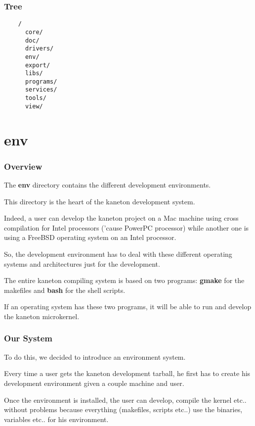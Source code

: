 
\begin{frame}[containsverbatim]
  \frametitle{Tree}

  \begin{center}

  \begin{verbatim}
    /
      core/
      doc/
      drivers/
      env/
      export/
      libs/
      programs/
      services/
      tools/
      view/
  \end{verbatim}

  \end{center}
\end{frame}

%
%

\section{env}


\begin{frame}
  \frametitle{Overview}

  The \textbf{env} directory contains the different development environments.

  \nl

  This directory is the heart of the kaneton development system.

  \nl

  Indeed, a user can develop the kaneton project on a Mac machine using
  cross compilation for Intel processors ('cause PowerPC processor)
  while another one is using a FreeBSD operating system on an Intel processor.

  \nl

  So, the development environment has to deal with these different operating
  systems and architectures just for the development.

  \nl

  The entire kaneton compiling system is based on two programs:
  \textbf{gmake} for the makefiles and \textbf{bash} for the shell scripts.

  \nl

  If an operating system has these two programs, it will be able to run
  and develop the kaneton microkernel.
\end{frame}


\begin{frame}
  \frametitle{Our System}

  To do this, we decided to introduce an environment system.

  \nl

  Every time a user gets the kaneton development tarball, he first has to
  create his development environment given a couple machine and user.

  \nl

  Once the environment is installed, the user can develop, compile the kernel
  etc.. without problems because everything (makefiles, scripts etc..) use
  the binaries, variables etc.. for his environment.
\end{frame}

